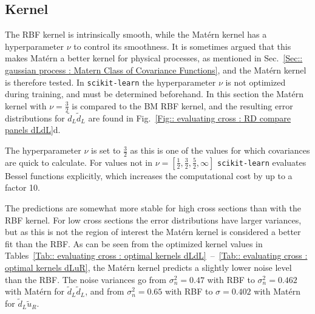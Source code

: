 \documentclass[twoside,english]{uiofysmaster}
\begin{document}
{%



\subsection{Kernel}

The RBF kernel is intrinsically smooth, while the Mat\'{e}rn kernel has a hyperparameter $\nu$ to control its smoothness. It is sometimes argued that this makes Mat\'{e}rn a better kernel for physical processes, as mentioned in Sec.~\ref{Sec:: gaussian process : Matern Class of Covariance Functions}, and the Mat\'{e}rn kernel is therefore tested. In \verb|scikit-learn| the hyperparameter $\nu$ is not optimized during training, and must be determined beforehand. In this section the Mat\'{e}rn kernel with $\nu=\frac{3}{2}$ is compared to the BM RBF kernel, and the resulting error distributions for $\widetilde{d}_L \widetilde{d}_L$ are found in Fig.~\ref{Fig:: evaluating cross : RD compare panels dLdL}d. 

The hyperparameter $\nu$ is set to $\frac{3}{2}$ as this is one of the values for which covariances are quick to calculate. For values not in $\nu = [\frac{1}{2}, \frac{3}{2}, \frac{5}{2}, \infty]$ \verb|scikit-learn| evaluates Bessel functions explicitly, which increases the computational cost by up to a factor 10. 

The predictions are somewhat more stable for high cross sections than with the RBF kernel. For low cross sections the error distributions have larger variances, but as this is not the region of interest the Mat\'{e}rn kernel is considered a better fit than the RBF. As can be seen from the optimized kernel values in Tables~\ref{Tab:: evaluating cross : optimal kernels dLdL}~--~\ref{Tab:: evaluating cross : optimal kernels dLuR}, the Mat\'{e}rn kernel predicts a slightly lower noise level than the RBF. The noise variances go from $\sigma_n^2 = 0.47$ with RBF to $\sigma_n^2 = 0.462$ with Mat\'{e}rn for $\widetilde{d}_L \widetilde{d}_L$, and from $\sigma_n^2 = 0.65$ with RBF to $\sigma = 0.402$ with Mat\'{e}rn for $\widetilde{d}_L \widetilde{u}_R$. 

}
\end{document}
